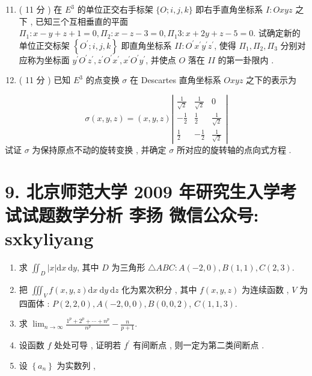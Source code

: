 \documentclass[10pt]{article}
\begin{document}
{\begin{enumerate}
  \setcounter{enumi}{10}
  \item ( 11  分 )  在  $E^{3}$  的单位正交右手标架  $\{O ; i, j, k\}$  即右手直角坐标系  $I: O x y z$  之下 ,  已知三个互相垂直的平面  $\Pi_{1}: x-y+z+1=0, \Pi_{2}: x-z-3=0, \Pi_{1} 3: x+2 y+z-5=0$.  试确定新的单位正交标架  $\left\{O^{\prime} ; i, j, k\right\}$  即直角坐标系  $I I: O^{\prime} x^{\prime} y^{\prime} z^{\prime}$,  使得  $\Pi_{1}, \Pi_{2}, \Pi_{3}$  分别对应称为坐标面  $y^{\prime} O^{\prime} z^{\prime}, z^{\prime} O^{\prime} x^{\prime}, x^{\prime} O^{\prime} y^{\prime}$,  并使点  $O$  落在  $I I$  的第一卦限内 .

  \item ( 11  分 )  已知  $E^{3}$  的点变换  $\sigma$  在  Descartes  直角坐标系  $O x y z$  之下的表示为 

\end{enumerate}
$$
\sigma(x, y, z)=(x, y, z)\left|\begin{array}{ccc}
\frac{1}{\sqrt{2}} & \frac{1}{\sqrt{2}} & 0 \\
-\frac{1}{2} & \frac{1}{2} & \frac{1}{\sqrt{2}} \\
\frac{1}{2} & -\frac{1}{2} & \frac{1}{\sqrt{2}}
\end{array}\right|
$$
 试证  $\sigma$  为保持原点不动的旋转变换 ,  并确定  $\sigma$  所对应的旋转轴的点向式方程 .

\section{9. 北京师范大学 2009 年研究生入学考试试题数学分析 
 李扬 
 微信公众号: sxkyliyang}
\begin{enumerate}
  \item  求  $\iint_{D}|x| \mathrm{d} x \mathrm{~d} y$,  其中  $D$  为三角形  $\triangle A B C: A(-2,0), B(1,1), C(2,3)$.

  \item  把  $\iiint_{V} f(x, y, z) \mathrm{d} x \mathrm{~d} y \mathrm{~d} z$  化为累次积分 ,  其中  $f(x, y, z)$  为连续函数 , $V$  为四面体 : $P(2,2,0), A(-2,0,0), B(0,0,2)$, $C(1,1,3) .$

  \item  求  $\lim _{n \rightarrow \infty} \frac{1^{p}+2^{p}+\cdots+n^{p}}{n^{p}}-\frac{n}{p+1}$.

  \item  设函数  $f$  处处可导 ,  证明若  $f^{\prime}$  有间断点 ,  则一定为第二类间断点 .

  \item  设  $\left\{a_{n}\right\}$  为实数列 ,


\end{enumerate}}
\end{document}

